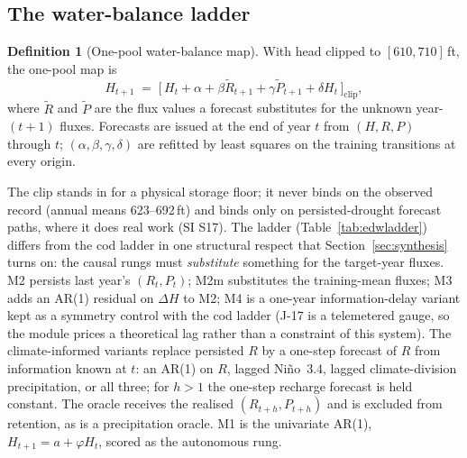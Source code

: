 \documentclass[preprint,11pt,authoryear]{elsarticle}
\theoremstyle{definition}
\newtheorem{definition}{Definition}
\theoremstyle{remark}
\begin{document}
\subsection{The water-balance ladder}\label{sec:edw_ladder}

\begin{definition}[One-pool water-balance map]\label{def:pool}
With head clipped to $[610,710]$\,ft, the one-pool map is
\begin{equation}\label{eq:pool}
H_{t+1} \;=\; \bigl[\,H_t + \alpha + \beta\tilde R_{t+1} + \gamma\tilde P_{t+1} + \delta H_t\,\bigr]_{\mathrm{clip}},
\end{equation}
where $\tilde R$ and $\tilde P$ are the flux values a forecast substitutes for the unknown year-$(t+1)$ fluxes. Forecasts are issued at the end of year $t$ from $(H,R,P)$ through $t$; $(\alpha,\beta,\gamma,\delta)$ are refitted by least squares on the training transitions at every origin.
\end{definition}

The clip stands in for a physical storage floor; it never binds on the observed record (annual means 623--692\,ft) and binds only on persisted-drought forecast paths, where it does real work (SI S17). The ladder (Table~\ref{tab:edwladder}) differs from the cod ladder in one structural respect that Section~\ref{sec:synthesis} turns on: the causal rungs must \emph{substitute} something for the target-year fluxes. M2 persists last year's $(R_t,P_t)$; M2m substitutes the training-mean fluxes; M3 adds an AR(1) residual on $\Delta H$ to M2; M4 is a one-year information-delay variant kept as a symmetry control with the cod ladder (J-17 is a telemetered gauge, so the module prices a theoretical lag rather than a constraint of this system). The climate-informed variants replace persisted $R$ by a one-step forecast of $R$ from information known at $t$: an AR(1) on $R$, lagged Ni\~no~3.4, lagged climate-division precipitation, or all three; for $h>1$ the one-step recharge forecast is held constant. The oracle receives the realised $(R_{t+h},P_{t+h})$ and is excluded from retention, as is a precipitation oracle. M1 is the univariate AR(1), $H_{t+1}=a+\varphi H_t$, scored as the autonomous rung.
\end{document}
